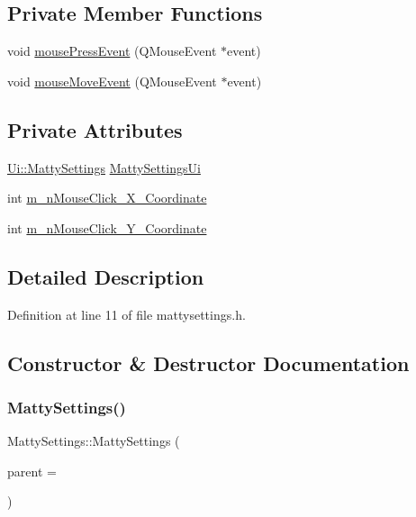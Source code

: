 \subsection*{Private Member Functions}
\begin{DoxyCompactItemize}
\item 
void \hyperlink{classMattySettings_aedf4cc84f37e25a7704e1ced6c18df95}{mouse\+Press\+Event} (Q\+Mouse\+Event $\ast$event)
\item 
void \hyperlink{classMattySettings_a0d151b91e1d79229d6ae0addf858c0d8}{mouse\+Move\+Event} (Q\+Mouse\+Event $\ast$event)
\end{DoxyCompactItemize}
\subsection*{Private Attributes}
\begin{DoxyCompactItemize}
\item 
\hyperlink{classUi_1_1MattySettings}{Ui\+::\+Matty\+Settings} \hyperlink{classMattySettings_a6974b17b34c30385f6b503f40b460ea1}{Matty\+Settings\+Ui}
\item 
int \hyperlink{classMattySettings_aa1c8051298eee4d2e77a93af3ddeb9d0}{m\+\_\+n\+Mouse\+Click\+\_\+\+X\+\_\+\+Coordinate}
\item 
int \hyperlink{classMattySettings_a622b01c6b81a35e28b414079eaff132e}{m\+\_\+n\+Mouse\+Click\+\_\+\+Y\+\_\+\+Coordinate}
\end{DoxyCompactItemize}


\subsection{Detailed Description}


Definition at line 11 of file mattysettings.\+h.



\subsection{Constructor \& Destructor Documentation}
\hypertarget{classMattySettings_a0d5b0f74bacfcad4f084772a081294a9}{}\label{classMattySettings_a0d5b0f74bacfcad4f084772a081294a9} 
\subsubsection{\texorpdfstring{Matty\+Settings()}{MattySettings()}}
{\footnotesize\ttfamily Matty\+Settings\+::\+Matty\+Settings (\begin{DoxyParamCaption}\item[{Q\+Widget $\ast$}]{parent = {} }\end{DoxyParamCaption})}



